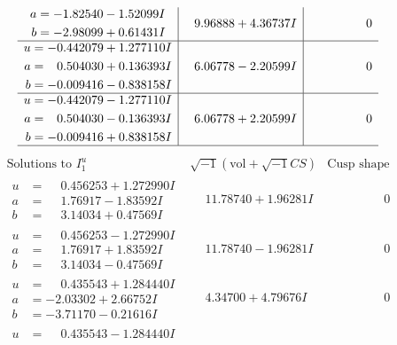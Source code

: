 \documentclass[1p]{elsarticle_modified}
\theoremstyle{definition}
\newcommand{\I}{\sqrt{-1}}
\begin{document}
$$\begin{array}{c|c|c}
\begin{aligned}
a &= -1.82540 - 1.52099 I \\
b &= -2.98099 + 0.61431 I\end{aligned}
 & \phantom{-}9.96888 + 4.36737 I & \phantom{-0.000000 } 0 \\ \hline\begin{aligned}
u &= -0.442079 + 1.277110 I \\
a &= \phantom{-}0.504030 + 0.136393 I \\
b &= -0.009416 - 0.838158 I\end{aligned}
 & \phantom{-}6.06778 - 2.20599 I & \phantom{-0.000000 } 0 \\ \hline\begin{aligned}
u &= -0.442079 - 1.277110 I \\
a &= \phantom{-}0.504030 - 0.136393 I \\
b &= -0.009416 + 0.838158 I\end{aligned}
 & \phantom{-}6.06778 + 2.20599 I & \phantom{-0.000000 } 0\\
 \hline 
 \end{array}$$\newpage$$\begin{array}{c|c|c}  
\text{Solutions to }I^u_{1}& \I (\text{vol} + \sqrt{-1}CS) & \text{Cusp shape}\\
 \hline 
\begin{aligned}
u &= \phantom{-}0.456253 + 1.272990 I \\
a &= \phantom{-}1.76917 - 1.83592 I \\
b &= \phantom{-}3.14034 + 0.47569 I\end{aligned}
 & \phantom{-}11.78740 + 1.96281 I & \phantom{-0.000000 } 0 \\ \hline\begin{aligned}
u &= \phantom{-}0.456253 - 1.272990 I \\
a &= \phantom{-}1.76917 + 1.83592 I \\
b &= \phantom{-}3.14034 - 0.47569 I\end{aligned}
 & \phantom{-}11.78740 - 1.96281 I & \phantom{-0.000000 } 0 \\ \hline\begin{aligned}
u &= \phantom{-}0.435543 + 1.284440 I \\
a &= -2.03302 + 2.66752 I \\
b &= -3.71170 - 0.21616 I\end{aligned}
 & \phantom{-}4.34700 + 4.79676 I & \phantom{-0.000000 } 0 \\ \hline\begin{aligned}
u &= \phantom{-}0.435543 - 1.284440 I \\

\end{aligned}
\end{array}$$
\end{document}
